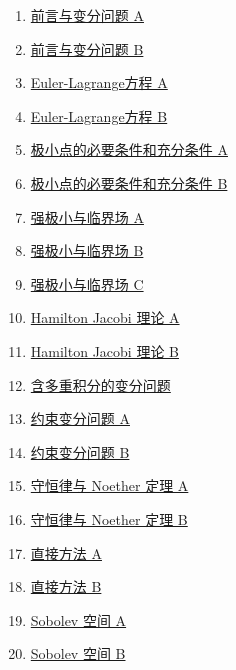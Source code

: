 \documentclass[11pt]{article}
\begin{document}
\begin{enumerate}
	\item  \href{https://mp.weixin.qq.com/s/CMXY7anEs6M3Nr2UqQIOBg}{前言与变分问题 A} %
	\item  \href{https://mp.weixin.qq.com/s/KGb4YkxCHowgFszqiPo9mQ}{前言与变分问题 B} %
	\item  \href{https://mp.weixin.qq.com/s/tkLrdZAb2TqX8GLMl9RByw}{Euler-Lagrange方程 A} %
	\item  \href{https://mp.weixin.qq.com/s/j3PZJUV3N6PNaUavw9mBhw}{Euler-Lagrange方程 B} %
	\item  \href{https://mp.weixin.qq.com/s/_RNK0fwfExx_sx-CT0y2gQ}{极小点的必要条件和充分条件 A} %
	\item  \href{https://mp.weixin.qq.com/s/hC2ZITjK1_QCjSRNPD8nBw}{极小点的必要条件和充分条件 B} %
	\item  \href{https://mp.weixin.qq.com/s/0V2-WjHAjQcaWQaMbcKUsQ}{强极小与临界场 A} %
	\item  \href{https://mp.weixin.qq.com/s/_-ZJzGpi8n15C6pUymI2xA}{强极小与临界场 B} %
	\item  \href{https://mp.weixin.qq.com/s/C4bcRqBi4DYLsOfQ_6K4kQ}{强极小与临界场 C} %
	\item  \href{https://mp.weixin.qq.com/s/XPcekfHeVQ-aC8GuXVR4og}{Hamilton Jacobi 理论 A} %
	\item  \href{https://mp.weixin.qq.com/s/O2OiEaxOZ46JHNwqf0ugfA}{Hamilton Jacobi 理论 B} %
	\item  \href{https://mp.weixin.qq.com/s/0_wg66FeanlIPXoaJ2Av4A}{含多重积分的变分问题} %
	\item  \href{https://mp.weixin.qq.com/s/-SCMHvQoZPIcVMo-bSIQ0A}{约束变分问题 A} %
	\item  \href{https://mp.weixin.qq.com/s/VkBuGSKMIeReAUUwNXevQQ}{约束变分问题 B} %
	\item  \href{https://mp.weixin.qq.com/s/1TbphFql7fT-_aXzPgcStA}{守恒律与 Noether 定理 A} %
	\item  \href{https://mp.weixin.qq.com/s/WluaUwv0P0U5I7k_s-jKJA}{守恒律与 Noether 定理 B} %
	\item  \href{https://mp.weixin.qq.com/s/-WcVEZHhgHJIOy1s5xLcbQ}{直接方法 A} %
	\item  \href{https://mp.weixin.qq.com/s/Lk3-goRw1ChjcICA3s3A4Q}{直接方法 B} %
	\item  \href{https://mp.weixin.qq.com/s/YP9Zd5r31N1fH2tEPgnGRg}{Sobolev 空间 A} %
	\item  \href{https://mp.weixin.qq.com/s/utiSRR3NmnhqM4nWMikAQQ}{Sobolev 空间 B} %

\end{enumerate}
\end{document}

